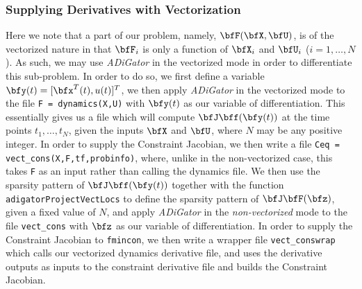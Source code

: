 \documentclass[10pt,pdftex]{article}
\begin{document}
\subsubsection*{Supplying Derivatives with Vectorization}
Here we note that a part of our problem, namely, $\bfF(\bfX,\bfU)$, is of the vectorized nature in that $\bfF_i$ is only a function of $\bfX_i$ and $\bfU_i$ ($i = 1,\dots,N$). As such, we may use \emph{ADiGator} in the vectorized mode in order to differentiate this sub-problem. In order to do so, we first define a variable $\bfy(t) = [\bfx^T(t),u(t)]^T$, we then apply \emph{ADiGator} in the vectorized mode to the file \texttt{F = dynamics(X,U)} with $\bfy(t)$ as our variable of differentiation. This essentially gives us a file which will compute $\bfJ\bff(\bfy(t))$ at the time points $t_1,\dots,t_N$, given the inputs $\bfX$ and $\bfU$, where $N$ may be any positive integer. In order to supply the Constraint Jacobian, we then write a file \texttt{Ceq = vect\_cons(X,F,tf,probinfo)}, where, unlike in the non-vectorized case, this takes \texttt{F} as an input rather than calling the dynamics file. We then use the sparsity pattern of $\bfJ\bff(\bfy(t))$ together with the function \texttt{adigatorProjectVectLocs} to define the sparsity pattern of $\bfJ\bfF(\bfz)$, given a fixed value of $N$, and apply \emph{ADiGator} in the \emph{non-vectorized} mode to the file \texttt{vect\_cons} with $\bfz$ as our variable of differentiation. In order to supply the Constraint Jacobian to \texttt{fmincon}, we then write a wrapper file \texttt{vect\_conswrap} which calls our vectorized dynamics derivative file, and uses the derivative outputs as inputs to the constraint derivative file and builds the Constraint Jacobian.
\end{document}
